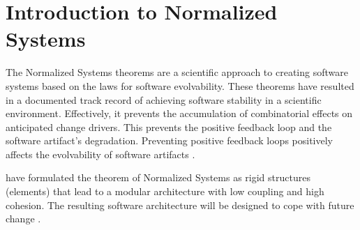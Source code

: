 \section{Introduction to Normalized Systems} \label{sec:inro_ns}

The Normalized Systems theorems are a scientific approach to creating software systems
based on the laws for software evolvability. These theorems have resulted in a documented
track record of achieving software stability in a scientific environment. Effectively, it
prevents the accumulation of combinatorial effects on anticipated change drivers. This
prevents the positive feedback loop and the software artifact's degradation.  Preventing
positive feedback loops positively affects the evolvability of software artifacts
\parencite[]{mannaert_normalized_2009}. 

\citeauthor[]{mannaert_normalized_2009} have formulated the theorem of Normalized Systems
as rigid structures (elements) that lead to a modular architecture with low
coupling and high cohesion. The resulting software architecture will be designed to cope
with future change \parencites[]{mannaert_normalized_2009}.